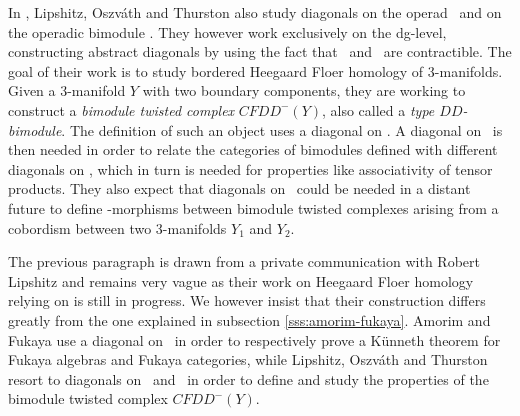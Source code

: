 \documentclass[twoside, 12pt]{amsart}
\theoremstyle{remark}
\begin{document}
In \cite{LOT20}, Lipshitz, Oszv\'ath and Thurston also study diagonals on the operad \Ainf\ and on the operadic bimodule \Minf . They however work exclusively on the dg-level, constructing abstract diagonals by using the fact that \Ainf\ and \Minf\ are contractible. The goal of their work is to study bordered Heegaard Floer homology of 3-manifolds.
Given a 3-manifold $Y$ with two boundary components, they are working to construct a \emph{bimodule twisted complex} $CFDD^-(Y)$, also called a \emph{type $DD$-bimodule}. The definition of such an object uses a diagonal on \Ainf . A diagonal on \Minf\ is then needed in order to relate the categories of bimodules defined with different diagonals on \Ainf , which in turn is needed for properties like associativity of tensor products. They also expect that diagonals on \Minf\ could be needed in a distant future to define \Ainf -morphisms between bimodule twisted complexes arising from a cobordism between two 3-manifolds $Y_1$ and $Y_2$.

The previous paragraph is drawn from a private communication with Robert Lipshitz and remains very vague as their work on Heegaard Floer homology relying on \cite{LOT20} is still in progress. We however insist that their construction differs greatly from the one explained in subsection \ref{sss:amorim-fukaya}. Amorim and Fukaya use a diagonal on \Ainf\ in order to respectively prove a K\"unneth theorem for Fukaya algebras and Fukaya categories, while Lipshitz, Oszv\'ath and Thurston resort to diagonals on \Ainf\ and \Minf\ in order to define and study the properties of the bimodule twisted complex $CFDD^-(Y)$. 

\newpage






\end{document}

